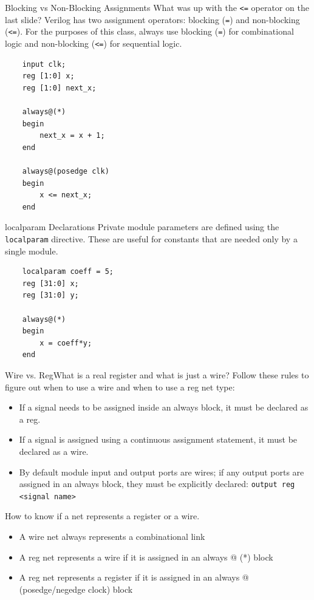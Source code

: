 \documentclass{beamer}
\begin{document}
\begin{frame}[fragile]{Blocking vs Non-Blocking Assignments}
	What was up with the \texttt{<=} operator on the last slide?
	Verilog has two assignment operators: blocking (\texttt{=}) and non-blocking (\texttt{<=}).
	For the purposes of this class, always use blocking (\texttt{=}) for combinational logic and non-blocking (\texttt{<=}) for sequential logic.

\begin{verbatim}
	input clk;
	reg [1:0] x;
	reg [1:0] next_x;

	always@(*)
	begin
		next_x = x + 1;
	end

	always@(posedge clk)
	begin
		x <= next_x;
	end
\end{verbatim}

\end{frame}

\begin{frame}[fragile]{localparam Declarations}
	Private module parameters are defined using the \texttt{localparam} directive.
	These are useful for constants that are needed only by a single module.

\begin{verbatim}
	localparam coeff = 5;
	reg [31:0] x;
	reg [31:0] y;

	always@(*)
	begin
		x = coeff*y;
	end

\end{verbatim}

\end{frame}

\begin{frame}[fragile]{Wire vs. Reg}{What is a real register and what is just a wire?}
	Follow these rules to figure out when to use a wire and when to use a reg net type:
	\begin{itemize}
		\item If a signal needs to be assigned inside an always block, it must be declared as a reg.
		\item If a signal is assigned using a continuous assignment statement, it must be declared as a wire.
		\item By default module input and output ports are wires; if any output ports are assigned in an always block, they must be explicitly declared: \texttt{output reg <signal name>}
	\end{itemize}
	
	How to know if a net represents a register or a wire.
	\begin{itemize}
		\item A wire net always represents a combinational link
		\item A reg net represents a wire if it is assigned in an always @ (*) block
		\item A reg net represents a register if it is assigned in an always @ (posedge/negedge clock) block
	\end{itemize}
\end{frame}
\end{document}
